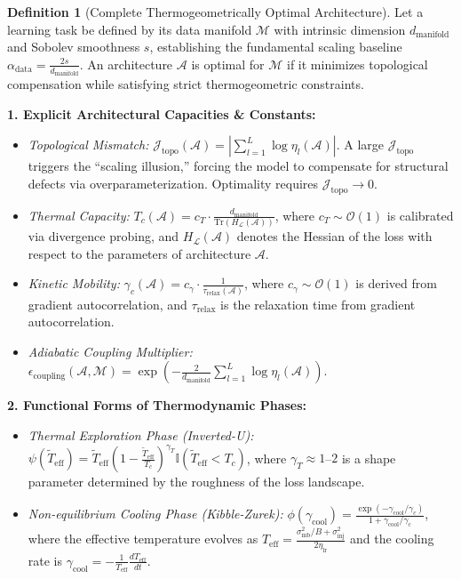 \documentclass[11pt, a4paper]{article}
\theoremstyle{definition}
\newtheorem{definition}{Definition}[section]
\begin{document}
\begin{definition}[Complete Thermogeometrically Optimal Architecture]
\label{def:complete_optimal_arch}
Let a learning task be defined by its data manifold $\mathcal{M}$ with intrinsic dimension $d_{\text{manifold}}$ and Sobolev smoothness $s$, establishing the fundamental scaling baseline $\alpha_{\text{data}} = \frac{2s}{d_{\text{manifold}}}$. An architecture $\mathcal{A}$ is optimal for $\mathcal{M}$ if it minimizes topological compensation while satisfying strict thermogeometric constraints.

\textbf{1. Explicit Architectural Capacities \& Constants:}
\begin{itemize}
 \item \emph{Topological Mismatch:} $\mathcal{J}_{\text{topo}}(\mathcal{A}) = \left| \sum_{l=1}^L \log \eta_l(\mathcal{A}) \right|$. A large $\mathcal{J}_{\text{topo}}$ triggers the ``scaling illusion,'' forcing the model to compensate for structural defects via overparameterization. Optimality requires $\mathcal{J}_{\text{topo}} \to 0$.
 \item \emph{Thermal Capacity:} $T_c(\mathcal{A}) = c_T \cdot \frac{d_{\text{manifold}}}{\text{Tr}(H_{\mathcal{L}}(\mathcal{A}))}$, where $c_T \sim \mathcal{O}(1)$ is calibrated via divergence probing, and $H_{\mathcal{L}}(\mathcal{A})$ denotes the Hessian of the loss with respect to the parameters of architecture $\mathcal{A}$.
 \item \emph{Kinetic Mobility:} $\gamma_c(\mathcal{A}) = c_\gamma \cdot \frac{1}{\tau_{\text{relax}}(\mathcal{A})}$, where $c_\gamma \sim \mathcal{O}(1)$ is derived from gradient autocorrelation, and $\tau_{\text{relax}}$ is the relaxation time from gradient autocorrelation.
 \item \emph{Adiabatic Coupling Multiplier:} $\epsilon_{\text{coupling}}(\mathcal{A}, \mathcal{M}) = \exp\left( -\frac{2}{d_{\text{manifold}}} \sum_{l=1}^L \log \eta_l(\mathcal{A}) \right)$.
\end{itemize}

\textbf{2. Functional Forms of Thermodynamic Phases:}
\begin{itemize}
 \item \emph{Thermal Exploration Phase (Inverted-U):} $\psi(\tilde{T}_{\text{eff}}) = \tilde{T}_{\text{eff}} \left( 1 - \frac{\tilde{T}_{\text{eff}}}{T_c} \right)^{\gamma_T} \mathbb{I}(\tilde{T}_{\text{eff}} < T_c)$, where $\gamma_T \approx 1$--$2$ is a shape parameter determined by the roughness of the loss landscape.
 \item \emph{Non-equilibrium Cooling Phase (Kibble-Zurek):} $\phi(\gamma_{\text{cool}}) = \frac{\exp(-\gamma_{\text{cool}}/\gamma_c)}{1 + \gamma_{\text{cool}}/\gamma_c}$, where the effective temperature evolves as $T_{\text{eff}} = \frac{\sigma_{\text{mb}}^2/B + \sigma_{\text{inj}}^2}{2\eta_{\text{lr}}}$ and the cooling rate is $\gamma_{\text{cool}} = -\frac{1}{T_{\text{eff}}}\frac{dT_{\text{eff}}}{dt}$.
\end{itemize}


\end{definition}
\end{document}
